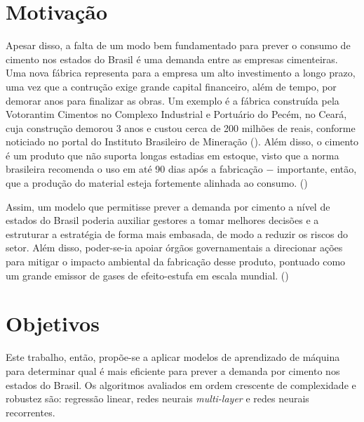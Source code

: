 \section*{Motivação}

Apesar disso, a falta de um modo bem fundamentado para prever o 
consumo de cimento nos estados do Brasil é 
uma demanda entre as empresas cimenteiras. Uma nova fábrica 
representa para a empresa um alto investimento a longo prazo,
uma vez que a contrução exige grande capital
financeiro, além de tempo, por demorar anos para finalizar as obras. 
Um exemplo é a fábrica construída pela Votorantim Cimentos no Complexo 
Industrial e Portuário do Pecém, no Ceará, cuja construção 
demorou 3 anos e custou cerca de 200 milhões de reais, conforme 
noticiado no portal do Instituto Brasileiro de Mineração 
(\cite{fabrica-noticia}).
Além disso, o cimento é um produto que não suporta longas 
estadias em estoque, visto que a norma brasileira recomenda
o uso em até 90 dias após a fabricação $-$ importante, então, que 
a produção do material esteja fortemente alinhada ao 
consumo. (\cite{abnt})

Assim, um modelo que permitisse prever a demanda por cimento a nível de 
estados do Brasil poderia auxiliar gestores a tomar melhores 
decisões e a estruturar a estratégia de forma mais embasada, de 
modo a reduzir os riscos do setor. Além disso, poder-se-ia apoiar órgãos 
governamentais a direcionar ações para mitigar o impacto ambiental da
fabricação desse produto, pontuado como um grande emissor de 
gases de efeito-estufa em escala mundial. (\cite{meio-ambiente})


\section*{Objetivos}


Este trabalho, então, propõe-se a aplicar modelos de aprendizado 
de máquina para determinar qual é mais eficiente para prever a 
demanda por cimento nos estados do Brasil. Os algoritmos avaliados em ordem 
crescente de complexidade e robustez são: 
regressão linear, redes neurais \textit{multi-layer} 
e redes neurais recorrentes.




